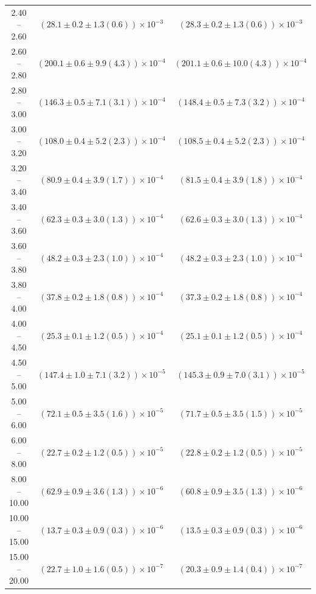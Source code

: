\begin{table}
\begin{center}
\begin{tabular}{ c | c c }
2.40 -- 2.60 & $(28.1\pm0.2\pm1.3(0.6))\times10^{-3}$ & $(28.3\pm0.2\pm1.3(0.6))\times10^{-3}$ \\ 
2.60 -- 2.80 & $(200.1\pm0.6\pm9.9(4.3))\times10^{-4}$ & $(201.1\pm0.6\pm10.0(4.3))\times10^{-4}$ \\ 
2.80 -- 3.00 & $(146.3\pm0.5\pm7.1(3.1))\times10^{-4}$ & $(148.4\pm0.5\pm7.3(3.2))\times10^{-4}$ \\ 
3.00 -- 3.20 & $(108.0\pm0.4\pm5.2(2.3))\times10^{-4}$ & $(108.5\pm0.4\pm5.2(2.3))\times10^{-4}$ \\ 
3.20 -- 3.40 & $(80.9\pm0.4\pm3.9(1.7))\times10^{-4}$ & $(81.5\pm0.4\pm3.9(1.8))\times10^{-4}$ \\ 
3.40 -- 3.60 & $(62.3\pm0.3\pm3.0(1.3))\times10^{-4}$ & $(62.6\pm0.3\pm3.0(1.3))\times10^{-4}$ \\ 
3.60 -- 3.80 & $(48.2\pm0.3\pm2.3(1.0))\times10^{-4}$ & $(48.2\pm0.3\pm2.3(1.0))\times10^{-4}$ \\ 
3.80 -- 4.00 & $(37.8\pm0.2\pm1.8(0.8))\times10^{-4}$ & $(37.3\pm0.2\pm1.8(0.8))\times10^{-4}$ \\ 
4.00 -- 4.50 & $(25.3\pm0.1\pm1.2(0.5))\times10^{-4}$ & $(25.1\pm0.1\pm1.2(0.5))\times10^{-4}$ \\ 
4.50 -- 5.00 & $(147.4\pm1.0\pm7.1(3.2))\times10^{-5}$ & $(145.3\pm0.9\pm7.0(3.1))\times10^{-5}$ \\ 
5.00 -- 6.00 & $(72.1\pm0.5\pm3.5(1.6))\times10^{-5}$ & $(71.7\pm0.5\pm3.5(1.5))\times10^{-5}$ \\ 
6.00 -- 8.00 & $(22.7\pm0.2\pm1.2(0.5))\times10^{-5}$ & $(22.8\pm0.2\pm1.2(0.5))\times10^{-5}$ \\ 
8.00 -- 10.00 & $(62.9\pm0.9\pm3.6(1.3))\times10^{-6}$ & $(60.8\pm0.9\pm3.5(1.3))\times10^{-6}$ \\ 
10.00 -- 15.00 & $(13.7\pm0.3\pm0.9(0.3))\times10^{-6}$ & $(13.5\pm0.3\pm0.9(0.3))\times10^{-6}$ \\ 
15.00 -- 20.00 & $(22.7\pm1.0\pm1.6(0.5))\times10^{-7}$ & $(20.3\pm0.9\pm1.4(0.4))\times10^{-7}$ \\ 
\hline
\end{tabular}
\end{center}
\end{table}
 
